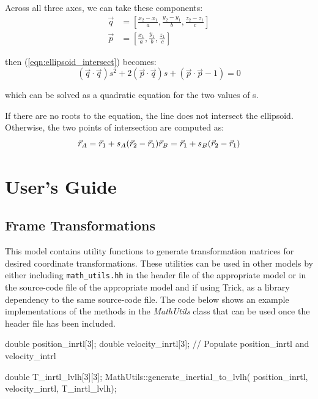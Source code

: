 \documentclass[11pt,fleqn]{report}
\begin{document}
Across all three axes, we can take these components:
\begin{align*}
\vec q & = \left[ \frac{x_2 - x_1}{a},
\frac{y_2 - y_1}{b},
\frac{z_2 - z_1}{c} \right] \\
\vec p & = \left[ \frac{x_1}{a},
\frac{y_1}{b},
\frac{z_1}{c} \right]
\end{align*}

then (\ref{eqn:ellipsoid_intersect}) becomes:
\begin{equation}
( \vec q \cdot \vec q) s^2 + 2 (\vec p \cdot \vec q) s + (\vec p \cdot
\vec p - 1) = 0
\end{equation}

which can be solved as a quadratic equation for the two values of s.

If there are no roots to the equation, the line does not intersect the
ellipsoid. Otherwise, the two points of intersection are computed as:
\begin{equation}
\vec r_A = \vec r_1 + s_A( \vec r_2 - \vec r_1) \\
\vec r_B = \vec r_1 + s_B( \vec r_2 - \vec r_1)
\end{equation}


\chapter{User's Guide}

\section{Frame Transformations}
This model contains utility functions to generate transformation matrices for
desired coordinate transformations. These utilities can be used in other
models by either including \texttt{math\_utils.hh} in the header file of
the appropriate model or in the source-code file of the appropriate model
and if using Trick, as a library dependency to the same source-code file.
The code below shows an example implementations of the methods in the
\textit{MathUtils} class that can be used once the header file has
been included.

\begin{code}
double position_inrtl[3];
double velocity_inrtl[3];
// Populate position_inrtl and velocity_intrl

double T_inrtl_lvlh[3][3];
MathUtils::generate_inertial_to_lvlh( position_inrtl,
velocity_inrtl,
T_inrtl_lvlh);
\end{code}
\end{document}
